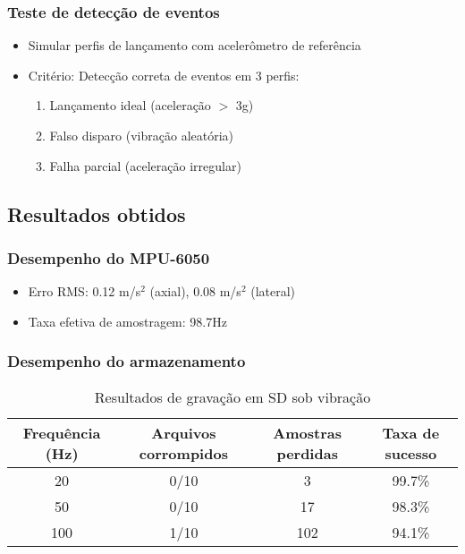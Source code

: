 \subsubsection{Teste de detecção de eventos}
\begin{itemize}
    \item Simular perfis de lançamento com acelerômetro de referência
    \item Critério: Detecção correta de eventos em 3 perfis:
    \begin{enumerate}
        \item Lançamento ideal (aceleração $>$ 3g)
        \item Falso disparo (vibração aleatória)
        \item Falha parcial (aceleração irregular)
    \end{enumerate}
\end{itemize}

\subsection{Resultados obtidos}
\subsubsection{Desempenho do MPU-6050}
\begin{itemize}
    \item Erro RMS: 0.12 m/s$^2$ (axial), 0.08 m/s$^2$ (lateral)
    \item Taxa efetiva de amostragem: 98.7Hz
\end{itemize}

\subsubsection{Desempenho do armazenamento}
\begin{table}[H]
    \centering
    \caption{Resultados de gravação em SD sob vibração}
    \begin{tabular}{|c|c|c|c|}
        \hline
        Frequência (Hz) & Arquivos corrompidos & Amostras perdidas & Taxa de sucesso \\
        \hline
        20 & 0/10 & 3 & 99.7\% \\
        50 & 0/10 & 17 & 98.3\% \\
        100 & 1/10 & 102 & 94.1\% \\
        \hline
    \end{tabular}
\end{table}

